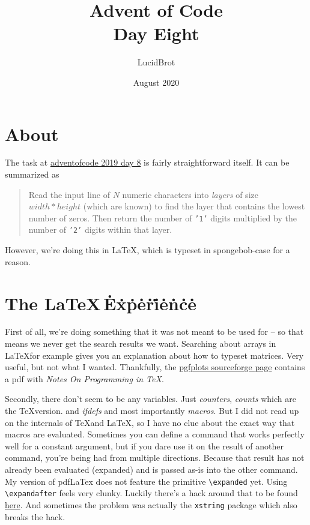 \documentclass{article} \usepackage[utf8]{inputenc}
\title{Advent of Code\\
{\large Day Eight}}
\author{LucidBrot} \date{August 2020}
\begin{document}
\maketitle

\section{About}
The task at \href{https://adventofcode.com/2019/day/8}{adventofcode 2019 day 8} is fairly straightforward itself. It can be summarized as \begin{myquote}\begin{quote}
Read the input line of $N$ numeric characters into \textit{layers} of size $width * height$ (which are known) to find the layer that contains the lowest number of zeros. Then return the number of \texttt{'1'} digits multiplied by the number of \texttt{'2'} digits within that layer.
\end{quote}\end{myquote}

However, we're doing this in \LaTeX , which is typeset in spongebob-case for a reason.

\section{The \LaTeX\,\.E\.x\.p\.e\.r\.i\.e\.n\.c\.e}
First of all, we're doing something that it was not meant to be used for -- so that means we never get the search results we want. Searching about arrays in \LaTeX for example gives you an explanation about how to typeset matrices. Very useful, but not what I wanted. Thankfully, the \href{http://pgfplots.sourceforge.net/TeX-programming-notes.pdf}{pgfplots sourceforge page} contains a pdf with \textit{Notes On Programming in \TeX}.

Secondly, there don't seem to be any variables. Just \textit{counters}, \textit{counts} which are the \TeX version. and \textit{ifdefs} and most importantly \textit{macros}. But I did not read up on the internals of \TeX and \LaTeX, so I have no clue about the exact way that macros are evaluated. Sometimes you can define a command that works perfectly well for a constant argument, but if you dare use it on the result of another command, you're being had from multiple directions. Because that result has not already been evaluated (expanded) and is passed as-is into the other command. My version of pdfLaTex does not feature the primitive \texttt{\textbackslash expanded} yet. Using \texttt{\textbackslash expandafter} feels very clunky. Luckily there's a hack around that to be found \href{http://texhacks.blogspot.com/2010/12/forcing-full-expansion.html}{here}. And sometimes the problem was actually the \texttt{xstring} package which also breaks the hack.
\end{document}
